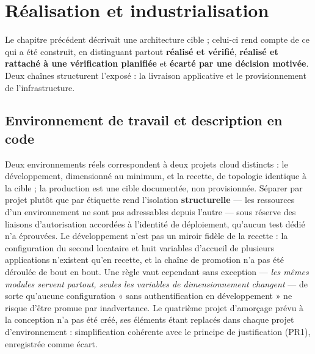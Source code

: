 \chapter{Réalisation et industrialisation}
\label{ch:realisation}


Le chapitre précédent décrivait une architecture cible ; celui-ci rend compte de ce qui a été
construit, en distinguant partout \textbf{réalisé et vérifié}, \textbf{réalisé et rattaché à une
vérification planifiée} et \textbf{écarté par une décision motivée}. Deux chaînes structurent
l'exposé : la livraison applicative et le provisionnement de l'infrastructure.

\section{Environnement de travail et description en code}
\label{sec:env-travail}

Deux environnements réels correspondent à deux projets cloud distincts : le développement,
dimensionné au minimum, et la recette, de topologie identique à la cible ; la production est une
cible documentée, non provisionnée. Séparer par projet plutôt que par étiquette rend l'isolation
\textbf{structurelle} --- les ressources d'un environnement ne sont pas adressables depuis
l'autre --- sous réserve des liaisons d'autorisation accordées à l'identité de déploiement,
qu'aucun test dédié n'a éprouvées. Le développement n'est pas un miroir fidèle de la recette : la
configuration du second locataire et huit variables d'accueil de plusieurs applications n'existent
qu'en recette, et la chaîne de promotion n'a pas été déroulée de bout en bout. Une règle vaut
cependant sans exception --- \emph{les mêmes modules servent partout, seules les variables de
dimensionnement changent} --- de sorte qu'aucune configuration « sans authentification en
développement » ne risque d'être promue par inadvertance. Le quatrième projet d'amorçage prévu à la
conception n'a pas été créé, ses éléments étant replacés dans chaque projet d'environnement :
simplification cohérente avec le principe de justification (PR1), enregistrée comme écart.


